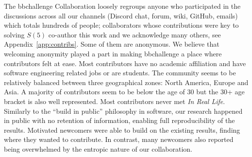\documentclass[a4paper,british]{article}
\theoremstyle{definition} %
\numberwithin{equation}{section}
\theoremstyle{definition} %
\newcommand{\CoqBB}{Coq-BB5\xspace}
\begin{document}
The bbchallenge Collaboration loosely regroups anyone who participated in the discussions across all our channels (Discord chat, forum, wiki, GitHub, emails) which totals hundreds of people; collaborators whose contributions were key to solving $S(5)$ co-author this work and we acknowledge many others, see Appendix~\ref{app:contribs}.  Some of them are anonymous. We believe that welcoming anonymity played a part in making bbchallenge a place where contributors felt at ease. Most contributors have no academic affiliation and have software engineering related jobs or are students. The community seems to be relatively balanced between three geographical zones: North America, Europe and Asia. A majority of contributors seem to be below the age of 30 but the 30+ age bracket is also well represented. Most contributors never met \textit{In Real Life}. Similarly to the ``build in public'' philosophy in software, our research happened in public with no retention of information, enabling full reproducibility of the results. Motivated newcomers were able to build on the existing results, finding where they wanted to contribute. In contrast, many newcomers also reported being overwhelmed by the entropic nature of our collaboration.



\end{document}
